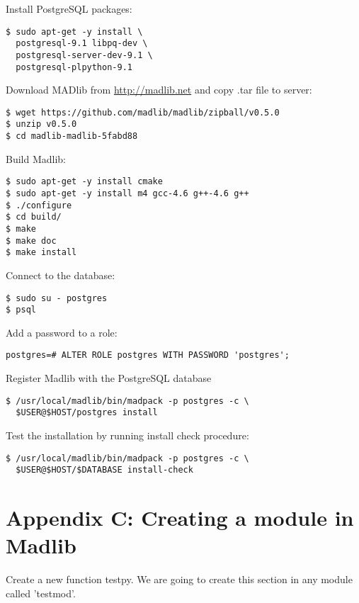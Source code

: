 \vspace{\baselineskip}
{\raggedleft Install PostgreSQL packages:}
\begin{verbatim}
$ sudo apt-get -y install \
  postgresql-9.1 libpq-dev \
  postgresql-server-dev-9.1 \
  postgresql-plpython-9.1
\end{verbatim}

{\raggedleft Download MADlib from \url{http://madlib.net} and copy .tar file to server:}
\begin{verbatim}
$ wget https://github.com/madlib/madlib/zipball/v0.5.0
$ unzip v0.5.0
$ cd madlib-madlib-5fabd88
\end{verbatim}

{\raggedleft Build Madlib:}
\begin{verbatim}
$ sudo apt-get -y install cmake
$ sudo apt-get -y install m4 gcc-4.6 g++-4.6 g++
$ ./configure
$ cd build/
$ make
$ make doc
$ make install
\end{verbatim}

{\raggedleft Connect to the database:}
\begin{verbatim}
$ sudo su - postgres
$ psql
\end{verbatim}

{\raggedleft Add a password to a role:}
\begin{verbatim}
postgres=# ALTER ROLE postgres WITH PASSWORD 'postgres';
\end{verbatim}

{\raggedleft Register Madlib with the PostgreSQL database}
\begin{verbatim}
$ /usr/local/madlib/bin/madpack -p postgres -c \ 
  $USER@$HOST/postgres install
\end{verbatim}

{\raggedleft Test the installation by running install check procedure:}
\begin{verbatim}
$ /usr/local/madlib/bin/madpack -p postgres -c \
  $USER@$HOST/$DATABASE install-check
\end{verbatim}

\section*{Appendix C: Creating a module in Madlib}

Create a new function testpy. We are going to create this section in any module called 'testmod'.

